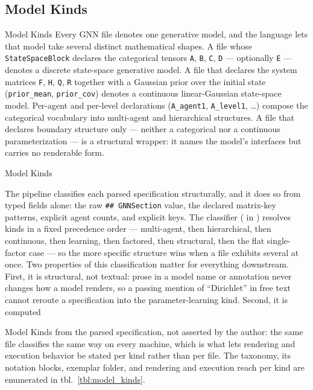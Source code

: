 \documentclass[
  ignorenonframetext,
]{beamer}
\begin{document}
\subsection{Model Kinds}\label{sec:model_kinds}

\begin{frame}{Model Kinds}
Every GNN file denotes one generative model, and the language lets that
model take several distinct mathematical shapes. A file whose
\texttt{StateSpaceBlock} declares the categorical tensors \texttt{A},
\texttt{B}, \texttt{C}, \texttt{D} --- optionally \texttt{E} --- denotes
a discrete state-space generative model. A file that declares the system
matrices \texttt{F}, \texttt{H}, \texttt{Q}, \texttt{R} together with a
Gaussian prior over the initial state (\texttt{prior\_mean},
\texttt{prior\_cov}) denotes a continuous linear-Gaussian state-space
model. Per-agent and per-level declarations (\texttt{A\_agent1},
\texttt{A\_level1}, \ldots) compose the categorical vocabulary into
multi-agent and hierarchical structures. A file that declares boundary
structure only --- neither a categorical nor a continuous
parameterization --- is a structural wrapper: it names the model's
interfaces but carries no renderable form.
\end{frame}

\begin{frame}{Model Kinds}

The pipeline classifies each parsed specification structurally, and it
does so from typed fields alone: the raw \texttt{\#\#\ GNNSection}
value, the declared matrix-key patterns, explicit agent counts, and
explicit  keys. The classifier
( in
) resolves kinds in a fixed
precedence order --- multi-agent, then hierarchical, then continuous,
then learning, then factored, then structural, then the flat
single-factor case --- so the more specific structure wins when a file
exhibits several at once. Two properties of this classification matter
for everything downstream. First, it is structural, not textual: prose
in a model name or annotation never changes how a model renders, so a
passing mention of ``Dirichlet'' in free text cannot reroute a
specification into the parameter-learning kind. Second, it is computed
\end{frame}

\begin{frame}{Model Kinds}
from the parsed specification, not asserted by the author: the same file
classifies the same way on every machine, which is what lets rendering
and execution behavior be stated per kind rather than per file. The
taxonomy, its notation blocks, exemplar folder, and rendering and
execution reach per kind are enumerated in tbl.~\ref{tbl:model_kinds}.

\end{frame}
\end{document}
